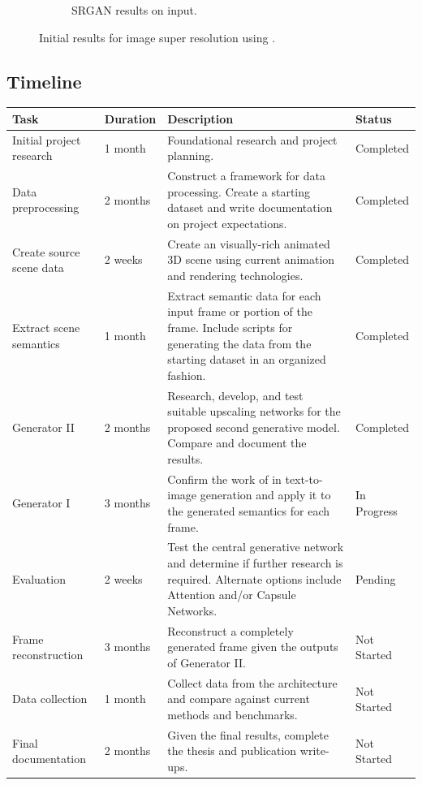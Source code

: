 \documentclass{article}
\begin{document}
\begin{figure}[h!]
\begin{subfigure}{0.45\textwidth}
\begin{center}
\begin{minipage}[t]{0.95\linewidth}
\begin{centering}
\caption{SRGAN results on input.}
\label{fig:srgan_outputs}
\end{centering}
\end{minipage}
\end{center}
\end{subfigure}
\caption{Initial results for image super resolution using \cite{srgan}.}
\label{fig:initial_results}
\end{figure}

\subsection{Timeline}
\label{subsec:timeline}

\begin{center}
\def\arraystretch{3}
\begin{tabular}{ | m{} | m{} | m{} | m{} | } 
\hline
\textbf{Task} & \textbf{Duration} & \textbf{Description} & \textbf{Status} \\ 
\hline
\hline
Initial project research & 1 month & Foundational research and project planning. & Completed \\
\hline
Data preprocessing & 2 months & Construct a framework for data processing. Create a starting dataset and write documentation on project expectations. & Completed\\
\hline
Create source scene data & 2 weeks & Create an visually-rich animated 3D scene using current animation and rendering technologies. & Completed\\
\hline
Extract scene semantics & 1 month & Extract semantic data for each input frame or portion of the frame. Include scripts for generating the data from the starting dataset in an organized fashion. & Completed \\
\hline
Generator II & 2 months & Research, develop, and test suitable upscaling networks for the proposed second generative model. Compare and document the results. & Completed \\
\hline
Generator I & 3 months & Confirm the work of \cite{leica} in text-to-image generation and apply it to the generated semantics for each frame. & In Progress \\
\hline
Evaluation & 2 weeks & Test the central generative network and determine if further research is required. Alternate options include Attention and/or Capsule Networks. & Pending \\
\hline
Frame reconstruction & 3 months & Reconstruct a completely generated frame given the outputs of Generator II. & Not Started \\
\hline
Data collection & 1 month & Collect data from the architecture and compare against current methods and benchmarks. & Not Started\\
\hline
Final documentation & 2 months & Given the final results, complete the thesis and publication write-ups. & Not Started\\
\hline
\end{tabular}
\end{center}

\nocite{pixel_cnn}



\end{document}

